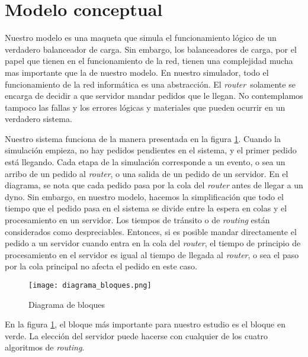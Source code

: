 \section{Modelo conceptual}

Nuestro modelo es una maqueta que simula el funcionamiento lógico de un verdadero balanceador de carga. Sin embargo, los
balanceadores de carga, por el papel que tienen en el funcionamiento de la red, tienen una complejidad mucha mas
importante que la de nuestro modelo. En nuestro simulador, todo el funcionamiento de la red informática es una
abstracción. El \textit{router} solamente se encarga de decidir a que servidor mandar pedidos que le llegan. No
contemplamos tampoco las fallas y los errores lógicas y materiales que pueden ocurrir en un verdadero sistema.

Nuestro sistema funciona de la manera presentada en la figura \ref{fig:diagrama-bloques}. Cuando la simulación empieza,
no hay pedidos pendientes en el sistema, y el primer pedido está llegando. Cada etapa de la simulación corresponde a un
evento, o sea un arribo de un pedido al \textit{router}, o una salida de un pedido de un servidor. En el diagrama, se
nota que cada pedido pasa por la cola del \textit{router} antes de llegar a un dyno. Sin embargo, en nuestro modelo,
hacemos la simplificación que todo el tiempo que el pedido pasa en el sistema se divide entre la espera en colas y el
procesamiento en un servidor. Los tiempos de tránsito o de \textit{routing} están considerados como despreciables.
Entonces, si es posible mandar directamente el pedido a un servidor cuando entra en la cola del \textit{router}, el
tiempo de principio de procesamiento en el servidor es igual al tiempo de llegada al \textit{router}, o sea el paso por
la cola principal no afecta el pedido en este caso.

\begin{figure}[h]
    \centering
    \texttt{[image: diagrama\_bloques.png]}
    \caption{Diagrama de bloques}
    \label{fig:diagrama-bloques}
\end{figure}

En la figura \ref{fig:diagrama-bloques}, el bloque más importante para nuestro estudio es el bloque en verde. La
elección del servidor puede hacerse con cualquier de los cuatro algoritmos de \textit{routing}.


